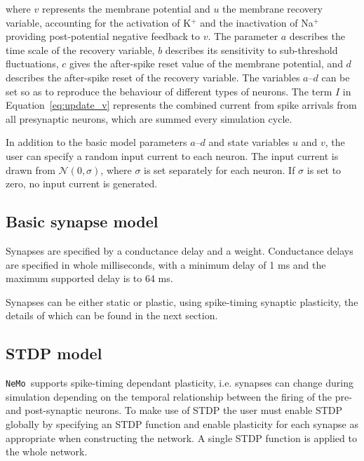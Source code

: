\documentclass[a4paper]{article}
\newcommand{\nemo}{\texttt{NeMo}}
\begin{document}
where $v$ represents the membrane potential
	and $u$ the membrane recovery variable,
	accounting for the activation of K$^+$
	and the inactivation of Na$^+$ 
	providing post-potential negative feedback to $v$.
The parameter $a$ describes the time scale of the recovery variable, 
	$b$ describes its sensitivity to sub-threshold fluctuations, 
	$c$ gives the after-spike reset value of the membrane potential, 
	and $d$ describes the after-spike reset of the recovery variable. 
The variables $a$--$d$ can be set so as to reproduce the behaviour of different types of neurons.
The term $I$ in Equation~\ref{eq:update_v} represents the combined 
	current from spike arrivals from all presynaptic neurons,
	which are summed every simulation cycle.

In addition to the basic model parameters $a$--$d$ and state variables $u$ and $v$,
	the user can specify a random input current to each neuron. 
The input current is drawn from $\mathcal{N}(0, \sigma)$,
	where $\sigma$ is set separately for each neuron.
If $\sigma$ is set to zero, no input current is generated.


\subsection{Basic synapse model}
\label{model:synapse}

Synapses are specified by a conductance delay and a weight.
Conductance delays are specified in whole milliseconds, 
	with a minimum delay of 1 ms
	and the maximum supported delay is to 64 ms.

Synapses can be either static or plastic,
	using spike-timing synaptic plasticity,
	the details of which can be found in the next section.

\subsection{STDP model}
\label{model:stdp}

\nemo\ supports spike-timing dependant plasticity,
	i.e. synapses can change during simulation depending on the temporal relationship 
between the firing of the pre- and post-synaptic neurons. 
To make use of STDP the user must enable STDP globally by specifying an STDP function
	and enable plasticity for each synapse as appropriate when constructing the network.
A single STDP function is applied to the whole network.
\end{document}
